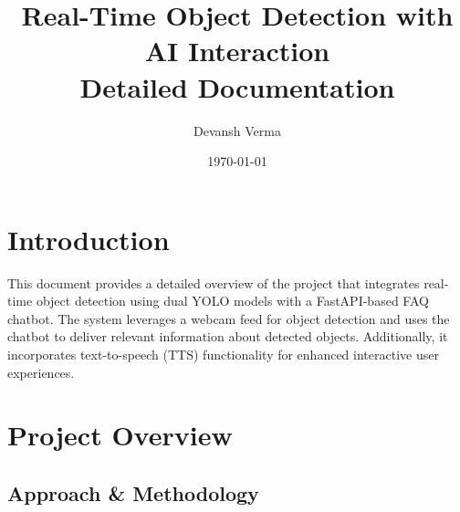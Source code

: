\documentclass[12pt]{article}
\title{\textbf{Real-Time Object Detection with AI Interaction}\\[1ex]
\large Detailed Documentation}
\author{Devansh Verma}
\date{\today}
\begin{document}
\maketitle

\tableofcontents

\section{Introduction}

This document provides a detailed overview of the project that integrates real-time object detection using dual YOLO models with a FastAPI-based FAQ chatbot. The system leverages a webcam feed for object detection and uses the chatbot to deliver relevant information about detected objects. Additionally, it incorporates text-to-speech (TTS) functionality for enhanced interactive user experiences.

\section{Project Overview}

\subsection{Approach \& Methodology}
\end{document}
